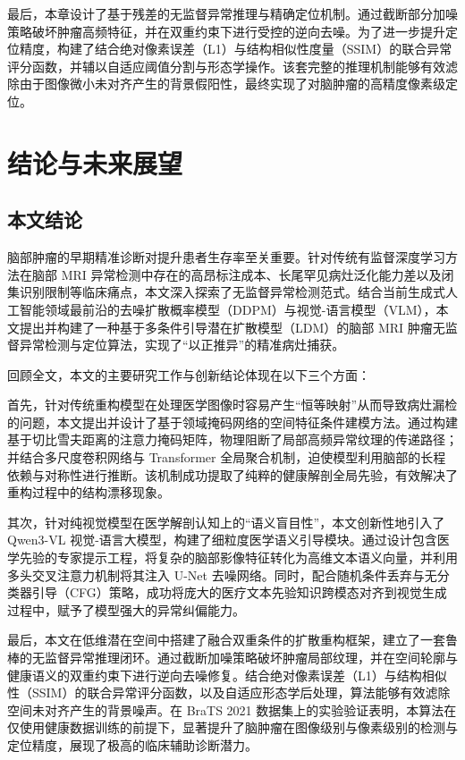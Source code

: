 \documentclass[Win]{xjtuBSThesis}  %
\begin{document}
最后，本章设计了基于残差的无监督异常推理与精确定位机制。通过截断部分加噪策略破坏肿瘤高频特征，并在双重约束下进行受控的逆向去噪。为了进一步提升定位精度，构建了结合绝对像素误差（L1）与结构相似性度量（SSIM）的联合异常评分函数，并辅以自适应阈值分割与形态学操作。该套完整的推理机制能够有效滤除由于图像微小未对齐产生的背景假阳性，最终实现了对脑肿瘤的高精度像素级定位。


\section{结论与未来展望}

\subsection{本文结论}

脑部肿瘤的早期精准诊断对提升患者生存率至关重要。针对传统有监督深度学习方法在脑部 MRI 异常检测中存在的高昂标注成本、长尾罕见病灶泛化能力差以及闭集识别限制等临床痛点，本文深入探索了无监督异常检测范式。结合当前生成式人工智能领域最前沿的去噪扩散概率模型（DDPM）与视觉-语言模型（VLM），本文提出并构建了一种基于多条件引导潜在扩散模型（LDM）的脑部 MRI 肿瘤无监督异常检测与定位算法，实现了“以正推异”的精准病灶捕获。

回顾全文，本文的主要研究工作与创新结论体现在以下三个方面：

首先，针对传统重构模型在处理医学图像时容易产生“恒等映射”从而导致病灶漏检的问题，本文提出并设计了基于领域掩码网络的空间特征条件建模方法。通过构建基于切比雪夫距离的注意力掩码矩阵，物理阻断了局部高频异常纹理的传递路径；并结合多尺度卷积网络与 Transformer 全局聚合机制，迫使模型利用脑部的长程依赖与对称性进行推断。该机制成功提取了纯粹的健康解剖全局先验，有效解决了重构过程中的结构漂移现象。

其次，针对纯视觉模型在医学解剖认知上的“语义盲目性”，本文创新性地引入了 Qwen3-VL 视觉-语言大模型，构建了细粒度医学语义引导模块。通过设计包含医学先验的专家提示工程，将复杂的脑部影像特征转化为高维文本语义向量，并利用多头交叉注意力机制将其注入 U-Net 去噪网络。同时，配合随机条件丢弃与无分类器引导（CFG）策略，成功将庞大的医疗文本先验知识跨模态对齐到视觉生成过程中，赋予了模型强大的异常纠偏能力。

最后，本文在低维潜在空间中搭建了融合双重条件的扩散重构框架，建立了一套鲁棒的无监督异常推理闭环。通过截断加噪策略破坏肿瘤局部纹理，并在空间轮廓与健康语义的双重约束下进行逆向去噪修复。结合绝对像素误差（L1）与结构相似性（SSIM）的联合异常评分函数，以及自适应形态学后处理，算法能够有效滤除空间未对齐产生的背景噪声。在 BraTS 2021 数据集上的实验验证表明，本算法在仅使用健康数据训练的前提下，显著提升了脑肿瘤在图像级别与像素级别的检测与定位精度，展现了极高的临床辅助诊断潜力。
\end{document}
